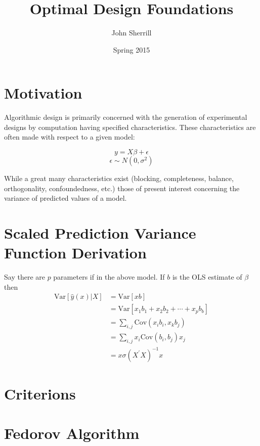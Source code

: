 \documentclass{article}\usepackage[]{graphicx}\usepackage[]{color}
\title{\vspace{-70pt} Optimal Design Foundations \vspace{-10pt}}
\author{John Sherrill\vspace{-20pt}}
\date{Spring 2015 \vspace{-10pt}}
\newcommand{\Var}{\mathrm{Var}}
\newcommand{\Cov}{\mathrm{Cov}}
\begin{document}
\maketitle

\section{Motivation}

Algorithmic design is primarily concerned with the generation of experimental designs by computation having specified characteristics. These characteristics are often made with respect to a given model:

$$ y = X\beta + \epsilon $$
$$ \epsilon \sim N(0, \sigma^2) $$

While a great many characteristics exist (blocking, completeness, balance, orthogonality, confoundedness, etc.) those of present interest concerning the variance of predicted values of a model.

\section{Scaled Prediction Variance Function Derivation}

Say there are $p$ parameters if in the above model. If $b$ is the OLS estimate of $\beta$ then
\begin{align*}
\Var[\hat{y}(x) | X] &= \Var[xb] \\
	&= \Var[x_1 b_1 + x_2 b_2 + \cdots + x_p b_b] \\
	&= \sum_{i,j} \Cov(x_i b_i, x_k b_j) \\
	&= \sum_{i,j} x_i \Cov(b_i, b_j) x_j \\
	&= x \sigma (X^' X)^{-1} x
\end{align*}

\section{Criterions}

\section{Fedorov Algorithm}
\end{document}
